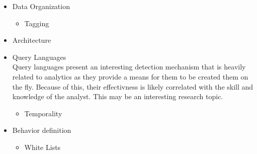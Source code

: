 \begin{enumerate}
\begin{itemize}
             \item Data Organization
                \begin{itemize}
                    \item Tagging
                \end{itemize}
                \item Architecture
                \item Query Languages\cite{mukherjee1994network}
                \\ Query languages present an interesting detection mechanism that is heavily related to analytics as they provide a means for them to be created them on the fly.
                Because of this, their effectivness is likely correlated with the skill and knowledge of the analyst.
                This may be an interesting research topic.
                \begin{itemize}
                    \item Temporality \cite{abraham2015predictive}\cite{abraham2014cyber}
                \end{itemize}
                \item Behavior definition
                    \begin{itemize}                                  \item White Lists\cite{yen2013beehive}
                    \end{itemize}
        \end{itemize}
\end{enumerate}